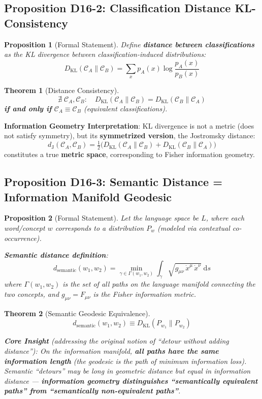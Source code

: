 \documentclass[12pt, a4paper]{article}
\newtheorem{theorem}{Theorem}[section]
\newtheorem{proposition}{Proposition}[section]
\newcommand{\diff}{\mathrm{d}}
\newcommand{\KL}{D_{\mathrm{KL}}}
\newcommand{\Jdist}{d_{\mathrm{J}}}
\newcommand{\ssemd}{d_{\mathrm{semantic}}}
\newcommand{\ssem}{\sqrt{g_{\mu\nu}\,\dot{x}^\mu\,\dot{x}^\nu}}
\begin{document}
\subsection{Proposition D16-2: Classification Distance KL-Consistency}

\begin{proposition}[Formal Statement]
Define \textbf{distance between classifications} as the KL divergence between classification-induced distributions:
\[
\KL(\mathcal{C}_A \| \mathcal{C}_B) = \sum_{x} p_A(x) \log \frac{p_A(x)}{p_B(x)}
\]
\end{proposition}

\begin{theorem}[Distance Consistency]\label{thm:D16-2}
\[
\nexists\;\mathcal{C}_A, \mathcal{C}_B:\quad \KL(\mathcal{C}_A \| \mathcal{C}_B) = \KL(\mathcal{C}_B \| \mathcal{C}_A)
\]
\textbf{if and only if} $\mathcal{C}_A \equiv \mathcal{C}_B$ (equivalent classifications).
\end{theorem}

\textbf{Information Geometry Interpretation}:
KL divergence is not a metric (does not satisfy symmetry), but its \textbf{symmetrized version}, the Jostromsky distance:
\[
\Jdist(\mathcal{C}_A, \mathcal{C}_B) = \tfrac{1}{2}\Big(\KL(\mathcal{C}_A \| \mathcal{C}_B) + \KL(\mathcal{C}_B \| \mathcal{C}_A)\Big)
\]
constitutes a true \textbf{metric space}, corresponding to Fisher information geometry.

\subsection{Proposition D16-3: Semantic Distance = Information Manifold Geodesic}

\begin{proposition}[Formal Statement]
Let the language space be $L$, where each word/concept $w$ corresponds to a distribution $P_w$ (modeled via contextual co-occurrence).

\textbf{Semantic distance definition}:
\[
\ssemd(w_1, w_2) = \min_{\gamma \in \Gamma(w_1, w_2)} \int_{\gamma} \ssem\;\diff s
\]
where $\Gamma(w_1, w_2)$ is the set of all paths on the language manifold connecting the two concepts, and $g_{\mu\nu} = F_{\mu\nu}$ is the Fisher information metric.
\end{proposition}

\begin{theorem}[Semantic Geodesic Equivalence]\label{thm:D16-3}
\[
\ssemd(w_1, w_2) \equiv \KL(P_{w_1} \| P_{w_2})
\]

\textbf{Core Insight} (addressing the original notion of ``detour without adding distance''):
On the information manifold, \textbf{all paths have the same information length} (the geodesic is the path of minimum information loss). Semantic ``detours'' may be long in geometric distance but equal in information distance --- \textbf{information geometry distinguishes ``semantically equivalent paths'' from ``semantically non-equivalent paths''}.
\end{theorem}
\end{document}
